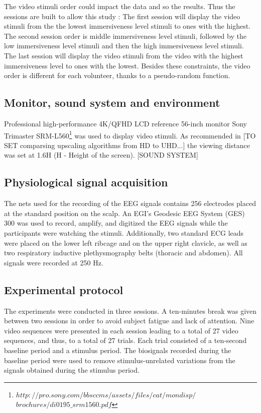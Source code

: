 The video stimuli order could impact the data and so the results. Thus
the sessions are built to allow this study : The first session will display
the video stimuli from the the lowest immersiveness level stimuli to ones
with the highest. The second session order is middle immersiveness level
stimuli, followed by the low immersiveness level stimuli and then the high
immersiveness level stimuli. The last session will display the video stimuli
from the video with the highest immersiveness level to ones with the lowest.
Besides these constraints, the video order is different for each volunteer,
thanks to a pseudo-random function.

\subsection{Monitor, sound system and environment}

Professional high-performance 4K/QFHD LCD reference 56-inch monitor Sony Trimaster SRM-L560\footnote{$http://pro.sony.com/bbsccms/assets/files/cat/mondisp/$ \newline $brochures/di0195\_srm1560.pdf$} was used to display video stimuli.
As recommended in [TO SET comparsing upscaling algorithms from HD to UHD...] the viewing distance was set at 1.6H (H - Height of the screen).
[SOUND SYSTEM]


\subsection{Physiological signal acquisition}
The nets used for the recording of the \ac{EEG} signals contains 256 electrodes placed at the standard position on the scalp. An EGI's Geodesic EEG System (GES) 300 was used to record, amplify, and digitized the EEG signals while the participants were watching the stimuli. Additionally, two standard ECG leads were placed on the lower left ribcage and on the upper right clavicle, as well as two respiratory inductive plethysmography belts (thoracic and abdomen). All signals were recorded at 250 Hz.


\subsection{Experimental protocol}

The experiments were conducted in three sessions. A ten-minutes break was given between two sessions in order to avoid subject fatigue and lack of attention. Nine video sequences were presented in each session leading to a total of 27 video sequences, and thus, to a total of 27 trials.
Each trial consisted of a ten-second baseline period and a stimulus period. The biosignals recorded during the baseline period were used to remove stimulus-unrelated variations from the signals obtained during the stimulus period.

